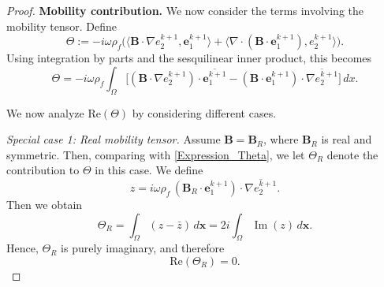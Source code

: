 \documentclass[pdflatex,sn-mathphys-num]{sn-jnl}
\theoremstyle{thmstyleone}%
\theoremstyle{thmstyletwo}%
\theoremstyle{thmstylethree}%
\theoremstyle{definition}
\begin{document}
\begin{proof}[Proof]
		\medskip
		
		\noindent
		\textbf{Mobility contribution.}
		We now consider the terms involving the mobility tensor. Define
		\[
		\Theta  := -i\omega \rho_f \Big( \langle \mathbf{B} \cdot \nabla e_2^{k+1}, \mathbf{e}_1^{k+1} \rangle + \langle \nabla \cdot (\mathbf{B} \cdot \mathbf{e}_1^{k+1}), e_2^{k+1} \rangle \Big).
		\]
		Using integration by parts and the sesquilinear inner product, this becomes
		\begin{equation}
			\Theta  = -i\omega \rho_f \int_\Omega \Big[ (\mathbf{B} \cdot \nabla e_2^{k+1}) \cdot \overline{\mathbf{e}_1^{k+1}} - (\mathbf{B} \cdot \mathbf{e}_1^{k+1}) \cdot \overline{\nabla e_2^{k+1} }\Big] \, dx.
			\label{Expression_Theta}
		\end{equation}
		
		
		\medskip
		
		\noindent
		We now analyze $\mathrm{Re}(\Theta)$ by considering different cases.
		
		\medskip
		
		
		\noindent
		\textit{Special case 1: Real mobility tensor.}
		Assume $\mathbf{B} = \mathbf{B}_R$, where $\mathbf{B}_R$ is real and symmetric. Then, comparing with \eqref{Expression_Theta}, we let $\Theta_{R}$ denote the contribution to $\Theta$ in this case.
		We define
		\[
		z = i \omega \rho_f \, (\mathbf{B}_R \cdot \mathbf{e}_1^{k+1}) 
		\cdot \overline{\nabla e_2^{k+1}}.
		\]
		Then we obtain
		\[
		\Theta_R = \int_\Omega (z - \bar{z})\, d\mathbf{x}=2i \int_\Omega \operatorname{Im}(z)\, d\mathbf{x}.
		\]
		Hence, $\Theta_R$ is purely imaginary, and therefore
		\[
		\mathrm{Re}(\Theta_R) = 0.
		\]
		

\end{proof}
\end{document}
